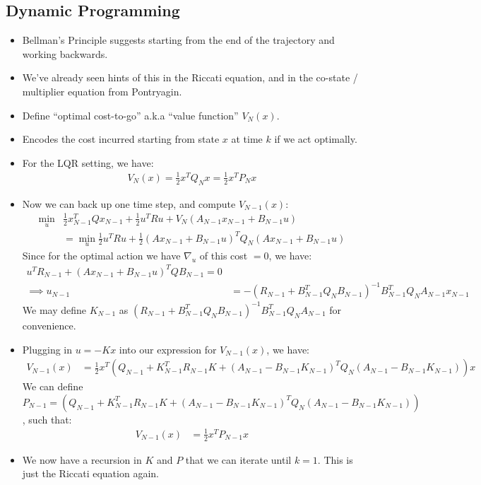 \subsection{Dynamic Programming}
\begin{itemize}
    \item Bellman's Principle suggests starting from the end of the trajectory and working backwards. 
    \item We've already seen hints of this in the Riccati equation, and in the co-state / multiplier equation from Pontryagin. 
    \item Define ``optimal cost-to-go'' a.k.a ``value function'' $V_N(x)$.
    \item Encodes the cost incurred starting from state $x$ at time $k$ if we act optimally. 
    \item For the LQR setting, we have: 
    \begin{align}
        V_N(x) = \frac{1}{2} x^T Q_N x = \frac{1}{2} x^T P_N x  
    \end{align}
    \item Now we can back up one time step, and compute $V_{N-1}(x)$:
    \begin{align}
        \min_u & \frac{1}{2} x_{N-1}^T Q x_{N-1} + \frac{1}{2} u^T R u + V_N (A_{N-1} x_{N-1} + B_{N-1} u) \\
        &= \min_u \frac{1}{2} u^T R u + \frac{1}{2} (A x_{N-1} + B_{N-1} u)^T Q_N  (A x_{N-1} + B_{N-1} u)
    \end{align}
    Since for the optimal action we have $\nabla_u $ of this cost $=0$, we have: 
\begin{align}
    u^T R_{N-1} + (A x_{N-1} + B_{N-1} u)^T Q B_{N-1} = 0 \\
    \implies u_{N-1} &= -(R_{N-1} + B_{N-1}^T Q_N B_{N-1})^{-1} B_{N-1}^T Q_N A_{N-1} x_{N-1} 
\end{align}
    We may define $K_{N-1}$ as $(R_{N-1} + B_{N-1}^T Q_N B_{N-1})^{-1} B_{N-1}^T Q_N A_{N-1}$ for convenience. 
    \item Plugging in $u=-Kx$ into our expression for $V_{N-1}(x)$, we have: 
    \begin{align}
        V_{N-1}(x) &= \frac{1}{2} x^T (Q_{N-1} + K_{N-1}^T R_{N-1} K + (A_{N-1} - B_{N-1} K_{N-1})^T Q_N (A_{N-1} - B_{N-1} K_{N-1}) ) x
    \end{align}
    We can define $P_{N-1} = (Q_{N-1} + K_{N-1}^T R_{N-1} K + (A_{N-1} - B_{N-1} K_{N-1})^T Q_N (A_{N-1} - B_{N-1} K_{N-1}) )$, such that:
    \begin{align}
        V_{N-1}(x) &= \frac{1}{2} x^T P_{N-1} x 
    \end{align}
    
    \item We now have a recursion in $K$ and $P$ that we can iterate until $k=1$. This is just the Riccati equation again. 
\end{itemize}

